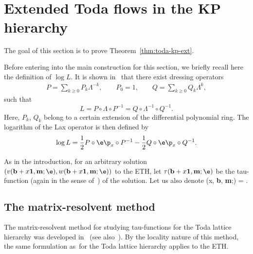 \section{Extended Toda flows in the KP hierarchy}\label{sectionTodaext}
The goal of this section is to prove Theorem~\ref{thm:toda-kp-ext}.

Before entering into the main construction for this section, we briefly recall here the definition of $\log L$.
It is shown in~\cite{CDZ} that there exist dressing operators
\begin{align*}%
P= \sum_{k\ge0} P_k \Lambda^{-k}, \qquad P_0= 1,\qquad
Q= \sum_{k\ge0} Q_k \Lambda^k, %
\end{align*}
such that
\[
L=P\circ\Lambda\circ P^{-1}=Q\circ\Lambda^{-1}\circ Q^{-1}.
\]
Here, $P_k$, $Q_k$ belong to a certain extension of the differential polynomial ring.
The logarithm of the Lax operator is then defined by~\cite{CDZ}
\[
\log L= \frac12 P\circ \e\p_x \circ P^{-1} - \frac12 Q\circ \e\p_x \circ Q^{-1}.
\]

As in the introduction, for an arbitrary solution $(v({\bf b}+x{\bf 1}, {\bf m};\e), w({\bf b}+x{\bf 1}, {\bf m};\e))$ to the ETH,
let $\tau({\bf b}+x{\bf 1}, {\bf m};\e)$ be the tau-function (again in the sense of~\cite{CDZ, DZ-toda})
 of the solution. Let us also denote
 \beq\label{defsigma}
 \sigma(x, {\bf b}, {\bf m};\e) = \log{}.
 \eeq

\subsection{The matrix-resolvent method}
The matrix-resolvent method for studying tau-functions for the Toda lattice hierarchy was developed in~\cite{DY} (see also~\cite{Y}).
By the locality nature of this method, the same formulation as~for the Toda lattice hierarchy
applies to the ETH.

